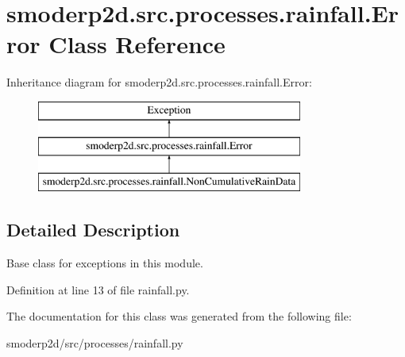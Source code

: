 \hypertarget{classsmoderp2d_1_1src_1_1processes_1_1rainfall_1_1Error}{\section{smoderp2d.\-src.\-processes.\-rainfall.\-Error Class Reference}
\label{classsmoderp2d_1_1src_1_1processes_1_1rainfall_1_1Error}
}
Inheritance diagram for smoderp2d.\-src.\-processes.\-rainfall.\-Error\-:\begin{figure}[H]
\begin{center}
\leavevmode
\includegraphics[height=3.000000cm]{d6/d1d/classsmoderp2d_1_1src_1_1processes_1_1rainfall_1_1Error}
\end{center}
\end{figure}


\subsection{Detailed Description}
\begin{DoxyVerb}Base class for exceptions in this module.\end{DoxyVerb}
 

Definition at line 13 of file rainfall.\-py.



The documentation for this class was generated from the following file\-:\begin{DoxyCompactItemize}
\item 
smoderp2d/src/processes/rainfall.\-py\end{DoxyCompactItemize}
